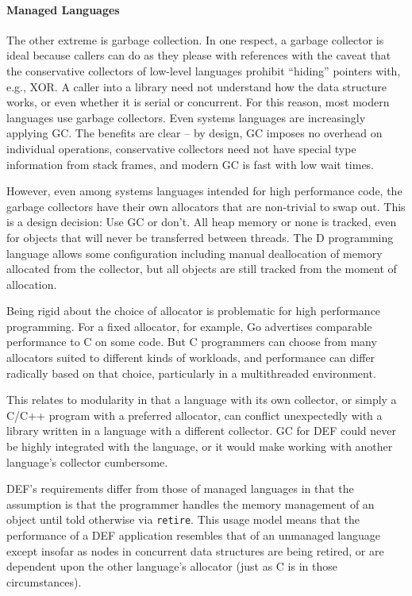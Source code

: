 \paragraph{Managed Languages} The other extreme is garbage collection.  In one respect, a garbage collector is ideal because callers can do as they please with references with the caveat that the conservative collectors of low-level languages prohibit ``hiding'' pointers with, e.g., XOR.  A caller into a library need not understand how the data structure works, or even whether it is serial or concurrent.  For this reason, most modern languages use garbage collectors.  Even systems languages are increasingly applying GC.\cite{D, Go, Nim}  The benefits are clear -- by design, GC imposes no overhead on individual operations, conservative collectors need not have special type information from stack frames, and modern GC is fast with low wait times.\cite{ShahriyarBM14}

However, even among systems languages intended for high performance code, the garbage collectors have their own allocators that are non-trivial to swap out.\cite{Go, DotNetGC, D}  This is a design decision: Use GC or don't.  All heap memory or none is tracked, even for objects that will never be transferred between threads.  The D programming language allows some configuration including manual deallocation of memory allocated from the collector, but all objects are still tracked from the moment of allocation.\cite{DPhobos}

Being rigid about the choice of allocator is problematic for high performance programming.  For a fixed allocator, for example, Go advertises comparable performance to C on some code.  But C programmers can choose from many allocators suited to different kinds of workloads, and performance can differ radically based on that choice, particularly in a multithreaded environment.\cite{Hoard, TCMalloc, JEMalloc, Supermalloc}

This relates to modularity in that a language with its own collector, or simply a C/C++ program with a preferred allocator, can conflict unexpectedly with a library written in a language with a different collector.  GC for DEF could never be highly integrated with the language, or it would make working with another language's collector cumbersome.

DEF's requirements differ from those of managed languages in that the assumption is that the programmer handles the memory management of an object until told otherwise via \texttt{retire}.  This usage model means that the performance of a DEF application resembles that of an unmanaged language except insofar as nodes in concurrent data structures are being retired, or are dependent upon the other language's allocator (just as C is in those circumstances).

